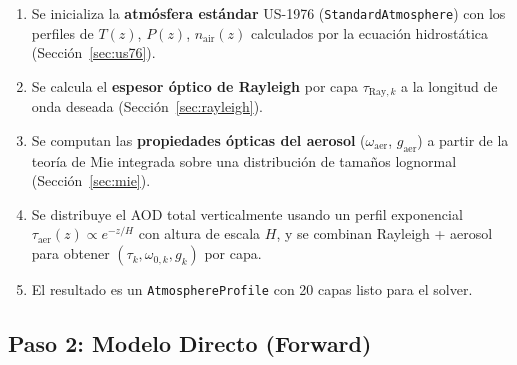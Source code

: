 \documentclass[a4paper,11pt]{article}
\begin{document}
\begin{enumerate}
    \item Se inicializa la \textbf{atm\'osfera est\'andar} US-1976
          (\texttt{StandardAtmosphere}) con los perfiles de $T(z)$, $P(z)$,
          $n_{\text{air}}(z)$ calculados por la ecuaci\'on hidrost\'atica
          (Secci\'on~\ref{sec:us76}).

    \item Se calcula el \textbf{espesor \'optico de Rayleigh} por capa
          $\tau_{\text{Ray},k}$ a la longitud de onda deseada
          (Secci\'on~\ref{sec:rayleigh}).

    \item Se computan las \textbf{propiedades \'opticas del aerosol}
          ($\omega_{\text{aer}}$, $g_{\text{aer}}$) a partir de la teor\'ia
          de Mie integrada sobre una distribuci\'on de tama\~nos lognormal
          (Secci\'on~\ref{sec:mie}).

    \item Se distribuye el AOD total verticalmente usando un perfil exponencial
          $\tau_{\text{aer}}(z) \propto e^{-z/H}$ con altura de escala $H$,
          y se combinan Rayleigh + aerosol para obtener
          $(\tau_k, \omega_{0,k}, g_k)$ por capa.

    \item El resultado es un \texttt{AtmosphereProfile} con 20 capas listo
          para el solver.
\end{enumerate}

\subsection{Paso 2: Modelo Directo (Forward)}
\end{document}
